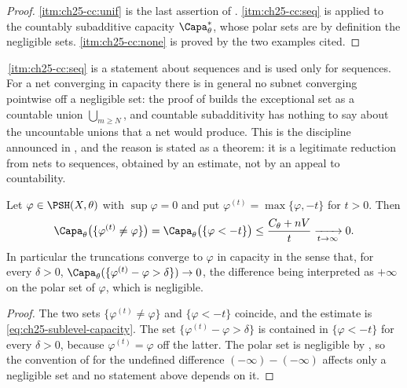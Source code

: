 \begin{proof}
\cref{itm:ch25-cc:unif} is the last assertion of
.  \cref{itm:ch25-cc:seq} is
 applied to the countably subadditive
capacity \(\Capa^*_\theta\), whose polar sets are by definition the
negligible sets.  \cref{itm:ch25-cc:none} is proved by the two examples
cited.
\end{proof}

\begin{remark}
\label{rem:ch25-nets-in-capacity}
\,\cref{itm:ch25-cc:seq} is a
statement about sequences and is used only for sequences.  For a net
converging in capacity there is in general no subnet converging pointwise
off a negligible set: the proof of
 builds the exceptional set as a countable
union \(\bigcup_{m\geq N}\), and countable subadditivity has nothing to say
about the uncountable unions that a net would produce.  This is the
discipline announced in , and the reason
 is stated as a theorem: it is a
legitimate reduction from nets to sequences, obtained by an estimate, not by
an appeal to countability.
\end{remark}

\begin{proposition}
\label{prop:ch25-truncation-capacity}
Let \(\varphi\in\PSH(X,\theta)\) with \(\sup\varphi=0\) and put
\(\varphi^{(t)}=\max\{\varphi,-t\}\) for \(t>0\).  Then
\[
 \Capa_\theta\bigl(\{\varphi^{(t)}\neq\varphi\}\bigr)
 =\Capa_\theta\bigl(\{\varphi<-t\}\bigr)
 \leq\frac{C_\theta+nV}{t}\xrightarrow[t\to\infty]{}0 .
\]
In particular the truncations converge to \(\varphi\) in capacity in the
sense that, for every \(\delta>0\),
\(\Capa_\theta(\{\varphi^{(t)}-\varphi>\delta\})\to0\), the difference being
interpreted as \(+\infty\) on the polar set of \(\varphi\), which is
negligible.
\end{proposition}

\begin{proof}
The two sets \(\{\varphi^{(t)}\neq\varphi\}\) and \(\{\varphi<-t\}\)
coincide, and the estimate is
\eqref{eq:ch25-sublevel-capacity}.  The set
\(\{\varphi^{(t)}-\varphi>\delta\}\) is contained in
\(\{\varphi<-t\}\) for every \(\delta>0\), because
\(\varphi^{(t)}=\varphi\) off the latter.  The polar set is negligible by
, so the convention of
 for the undefined difference
\((-\infty)-(-\infty)\) affects only a negligible set and no statement above
depends on it.
\end{proof}

